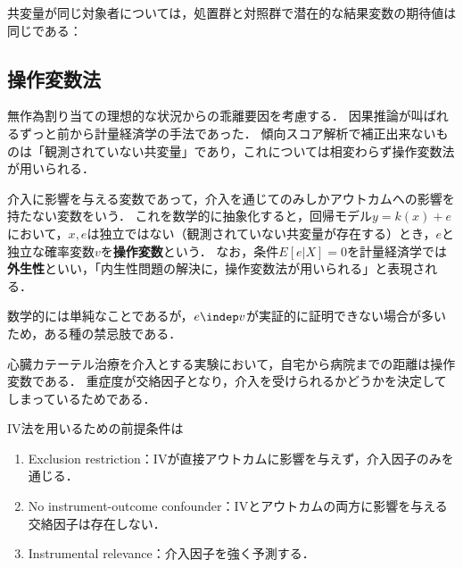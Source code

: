 \documentclass[uplatex,dvipdfmx]{jsreport}
\begin{document}
\begin{lemma}
    共変量が同じ対象者については，処置群と対照群で潜在的な結果変数の期待値は同じである：
\end{lemma}

\subsection{操作変数法}

\begin{tcolorbox}[colframe=ForestGreen, colback=ForestGreen!10!white,breakable,colbacktitle=ForestGreen!40!white,coltitle=black,fonttitle=\bfseries\sffamily,
title=]
    無作為割り当ての理想的な状況からの乖離要因を考慮する．
    因果推論が叫ばれるずっと前から計量経済学の手法であった．
    傾向スコア解析で補正出来ないものは「観測されていない共変量」であり，これについては相変わらず操作変数法が用いられる．
\end{tcolorbox}

\begin{definition}
    介入に影響を与える変数であって，介入を通じてのみしかアウトカムへの影響を持たない変数をいう．
    これを数学的に抽象化すると，回帰モデル$y=k(x)+e$において，$x,e$は独立ではない（観測されていない共変量が存在する）とき，$e$と独立な確率変数$v$を\textbf{操作変数}という．
    なお，条件$E[e|X]=0$を計量経済学では\textbf{外生性}といい，「内生性問題の解決に，操作変数法が用いられる」と表現される．
\end{definition}
\begin{remark}
    数学的には単純なことであるが，$e\indep v$が実証的に証明できない場合が多いため，ある種の禁忌肢である．
\end{remark}

\begin{example}
    心臓カテーテル治療を介入とする実験において，自宅から病院までの距離は操作変数である．
    重症度が交絡因子となり，介入を受けられるかどうかを決定してしまっているためである．
\end{example}

\begin{axiom}
    IV法を用いるための前提条件は
    \begin{enumerate}
        \item Exclusion restriction：IVが直接アウトカムに影響を与えず，介入因子のみを通じる．
        \item No instrument-outcome confounder：IVとアウトカムの両方に影響を与える交絡因子は存在しない．
        \item Instrumental relevance：介入因子を強く予測する．
    \end{enumerate}
\end{axiom}
\end{document}
